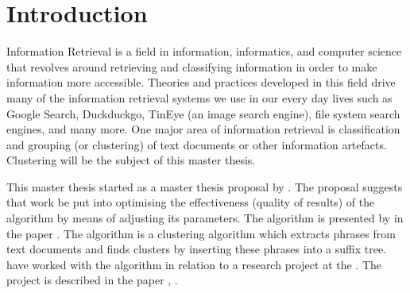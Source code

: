 
\chapter{Introduction} %

\label{Introduction}



Information Retrieval is a field in information, informatics, and computer science that revolves around retrieving and classifying information in order to make information more accessible. Theories and practices developed in this field drive many of the information retrieval systems we use in our every day lives such as Google Search, Duckduckgo, TinEye (an image search engine), file system search engines, and many more. One major area of information retrieval is classification and grouping (or clustering) of text documents or other information artefacts. Clustering will be the subject of this master thesis.

This master thesis started as a master thesis proposal by \supervisor. The proposal suggests that work be put into optimising the effectiveness (quality of results) of the \STC algorithm by means of adjusting its parameters. The \STC algorithm is presented by \textcite{Oren1998} in the paper . The algorithm is a clustering algorithm which extracts phrases from text documents and finds clusters by inserting these phrases into a suffix tree. \cite{Moe2014compact} have worked with the \STC algorithm in relation to a research project at the \deptname. The project is described in the paper , \cite{Elgesem2009}.

